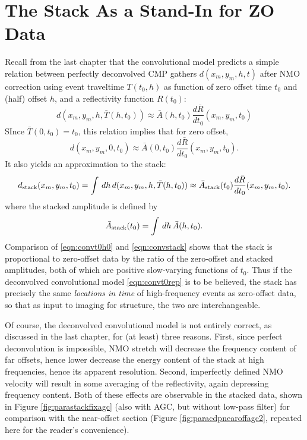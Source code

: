 \section{The Stack As a Stand-In for ZO Data}
Recall from the last chapter that the convolutional model predicts a simple relation between perfectly deconvolved CMP gathers $d(x_m,y_m,h,t)$ after NMO correction using event traveltime $T(t_0,h)$  as function of zero offset time $t_0$ and (half) offset $h$, and a reflectivity function $R(t_0)$:
\begin{equation}
\label{eqn:convt0rep}
d(x_m,y_m,h,\bar{T}(h,t_0)) \approx \bar{A}(h,t_0) \frac{d\bar{R}}{dt_0}(x_m,y_m,t_0) 
\end{equation}
SInce $\bar{T}(0,t_0)=t_0$, this relation implies that for zero offset,
\begin{equation}
\label{eqn:convt0h0}
d(x_m,y_m,0,t_0) \approx \bar{A}(0,t_0) \frac{d\bar{R}}{dt_0}(x_m,y_m,t_0). 
\end{equation}
It also yields an approximation to the stack:
\begin{equation}
\label{eqn:convstack}
d_{\rm stack}(x_m,y_m,t_0) = \int \, dh \,d(x_m,y_m,h,\bar{T}(h,t_0)) \approx \bar{A}_{\rm stack}(t_0) \frac{d\bar{R}}{dt_0}(x_m,y_m,t_0). 
\end{equation}
where the stacked amplitude is defined by
\begin{equation}
\label{eqn:stackamp}
\bar{A}_{\rm stack}(t_0) = \int \, dh \,\bar{A}(h,t_0) .
\end{equation}
Comparison of \ref{eqn:convt0h0} and \ref{eqn:convstack} shows that the stack is proportional to zero-offset data by the ratio of the zero-offset and stacked amplitudes, both of which are positive slow-varying functions of $t_0$. Thus if the deconvolved convolutional model \ref{eqn:convt0rep} is to be believed, the stack has precisely the same {\em locations in time} of high-frequency events as zero-offset data, so that as input to imaging for structure, the two are interchangeable.

Of course, the deconvolved convolutional model is not entirely correct, as discussed in the last chapter, for (at least) three reasons. First, since perfect deconvolution is impossible, NMO stretch will decrease the frequency content of far offsets, hence lower decrease the energy content of the stack at high frequencies, hence its apparent resolution. Second, imperfectly defined NMO velocity will result in some averaging of the reflectivity, again depressing frequency content. Both of these effects are observable in the stacked data, shown in Figure \ref{fig:parastackfixagc} (also with AGC, but without low-pass filter) for comparison with the near-offset section (Figure \ref{fig:paracdpnearoffagc2}, repeated here for the reader's convenience).


